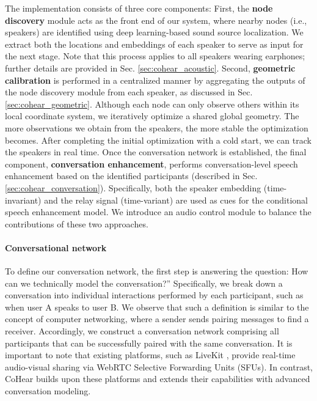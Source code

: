 The implementation consists of three core components:
First, the \textbf{node discovery} module acts as the front end of our system, where nearby nodes (i.e., speakers) are identified using deep learning-based sound source localization. We extract both the locations and embeddings of each speaker to serve as input for the next stage. Note that this process applies to all speakers wearing earphones; further details are provided in Sec. \ref{sec:cohear_acoustic}.
Second, \textbf{geometric calibration} is performed in a centralized manner by aggregating the outputs of the node discovery module from each speaker, as discussed in Sec. \ref{sec:cohear_geometric}. Although each node can only observe others within its local coordinate system, we iteratively optimize a shared global geometry. The more observations we obtain from the speakers, the more stable the optimization becomes. After completing the initial optimization with a cold start, we can track the speakers in real time.
Once the conversation network is established, the final component, \textbf{conversation enhancement}, performs conversation-level speech enhancement based on the identified participants (described in Sec. \ref{sec:cohear_conversation}). Specifically, both the speaker embedding (time-invariant) and the relay signal (time-variant) are used as cues for the conditional speech enhancement model. We introduce an audio control module to balance the contributions of these two approaches.

\paragraph{Conversational network}
To define our conversation network, the first step is answering the question: How can we technically model the conversation?'' Specifically, we break down a conversation into individual interactions performed by each participant, such as when user A speaks to user B. We observe that such a definition is similar to the concept of computer networking, where a sender sends pairing messages to find a receiver.
Accordingly, we construct a conversation network comprising all participants that can be successfully paired with the same conversation.
It is important to note that existing platforms, such as LiveKit \cite{livekit}, provide real-time audio-visual sharing via WebRTC \cite{blum2021webrtc} Selective Forwarding Units (SFUs). In contrast, CoHear builds upon these platforms and extends their capabilities with advanced conversation modeling.

